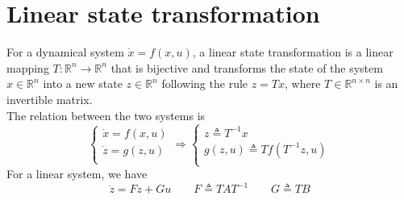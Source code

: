 \documentclass[12pt, openany]{report}
\theoremstyle{definition}
\newcommand{\R}{\mathbb{R}}
\begin{document}
\section{Linear state transformation}
For a dynamical system \(\dot x=f(x,u)\), a linear state transformation is a linear mapping \(T:\R^n\rightarrow \R^n\) that is bijective and transforms the state of the system \(x\in \R^n\) into a new state \(z\in \R^n\) following the rule \(z=Tx\), where \(T\in \R^{n\times n}\) is an invertible matrix. \\
The relation between the two systems is
\begin{equation}
    \begin{cases}
        \dot x=f(x,u)\\
        \dot z = g(z,u)\\
    \end{cases} \Longrightarrow \begin{cases}
        z\triangleq T^{-1}x\\
        g(z,u) \triangleq Tf(T^{-1}z,u)\\
    \end{cases}
\end{equation}
For a linear system, we have 
\begin{equation}
    \dot z = Fz+Gu \qquad F\triangleq TAT^{-1} \qquad G\triangleq TB
\end{equation}
\end{document}
